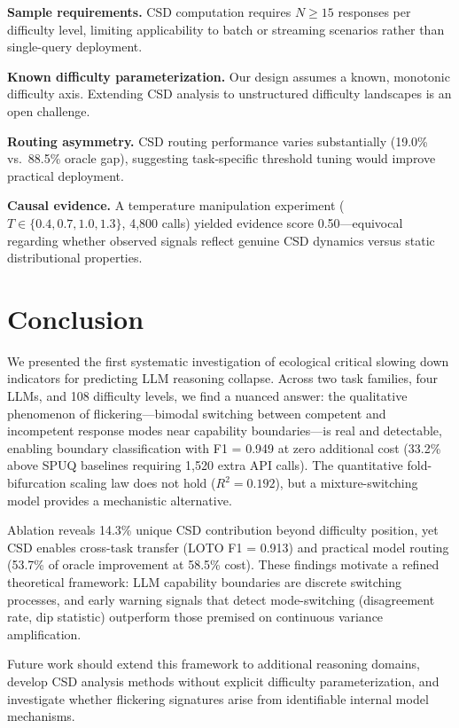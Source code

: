 \documentclass[11pt,letterpaper]{article}
\begin{document}
\textbf{Sample requirements.} CSD computation requires $N \geq 15$ responses per difficulty level, limiting applicability to batch or streaming scenarios rather than single-query deployment.

\textbf{Known difficulty parameterization.} Our design assumes a known, monotonic difficulty axis. Extending CSD analysis to unstructured difficulty landscapes is an open challenge.

\textbf{Routing asymmetry.} CSD routing performance varies substantially (19.0\% vs.\ 88.5\% oracle gap), suggesting task-specific threshold tuning would improve practical deployment.

\textbf{Causal evidence.} A temperature manipulation experiment ($T \in \{0.4, 0.7, 1.0, 1.3\}$, 4,800 calls) yielded evidence score 0.50---equivocal regarding whether observed signals reflect genuine CSD dynamics versus static distributional properties.


\section{Conclusion}

We presented the first systematic investigation of ecological critical slowing down indicators for predicting LLM reasoning collapse. Across two task families, four LLMs, and 108 difficulty levels, we find a nuanced answer: the qualitative phenomenon of flickering---bimodal switching between competent and incompetent response modes near capability boundaries---is real and detectable, enabling boundary classification with F1 = 0.949 at zero additional cost (33.2\% above SPUQ baselines requiring 1,520 extra API calls). The quantitative fold-bifurcation scaling law does not hold ($R^2 = 0.192$), but a mixture-switching model provides a mechanistic alternative.

Ablation reveals 14.3\% unique CSD contribution beyond difficulty position, yet CSD enables cross-task transfer (LOTO F1 = 0.913) and practical model routing (53.7\% of oracle improvement at 58.5\% cost). These findings motivate a refined theoretical framework: LLM capability boundaries are discrete switching processes, and early warning signals that detect mode-switching (disagreement rate, dip statistic) outperform those premised on continuous variance amplification.

Future work should extend this framework to additional reasoning domains, develop CSD analysis methods without explicit difficulty parameterization, and investigate whether flickering signatures arise from identifiable internal model mechanisms.



\end{document}
